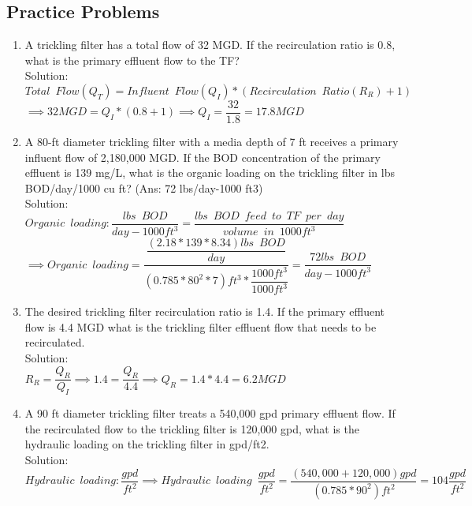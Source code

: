 \documentclass{article}
\begin{document}
\subsection{Practice Problems} 

\begin{enumerate}

\item A trickling filter has a total flow of 32 MGD.  If the recirculation ratio is 0.8, what is the primary effluent flow to the TF?\\
Solution:\\
$Total \enspace Flow (Q_T) = Influent \enspace Flow (Q_I)*(Recirculation \enspace Ratio(R_R) +1)$\\
$\implies 32 MGD=Q_I*(0.8+1)\implies Q_I=\dfrac{32}{1.8}=\boxed{17.8 MGD}$

\item A 80-ft diameter trickling filter with a media depth of 7 ft receives a primary influent flow of 2,180,000 MGD. If the BOD concentration of the primary effluent is 139 mg/L, what is the organic loading on the trickling filter in lbs BOD/day/1000 cu ft? (Ans: 72 lbs/day-1000 ft3)\\
Solution:\\
$Organic \enspace loading:\dfrac{lbs \enspace BOD}{day-1000ft^3}=\dfrac{lbs \enspace BOD \enspace feed \enspace to \enspace TF \enspace per \enspace day}{volume \enspace in \enspace 1000ft^3}$\\
\vspace{0.3cm}
$\implies Organic \enspace loading=\dfrac{\dfrac{(2.18*139*8.34)lbs \enspace BOD}{day}}{(0.785*80^2*7)ft^3*\dfrac{1000ft^3}{1000ft^3}}=\boxed{\dfrac{72 lbs \enspace BOD}{day-1000 ft^3}}$

\item The desired trickling filter recirculation ratio is 1.4.  If the primary effluent flow is 4.4 MGD what is the trickling filter effluent flow that needs to be recirculated.\\
Solution:\\
$R_R=\dfrac{Q_R}{Q_I}\implies 1.4=\dfrac{Q_R}{4.4}\implies Q_R =1.4*4.4=\boxed{6.2 MGD}$\\

\item A 90 ft diameter trickling filter treats a 540,000 gpd primary effluent flow. If the recirculated flow to the trickling filter is 120,000 gpd, what is the hydraulic loading on the trickling filter in gpd/ft2.\\
Solution:\\
$Hydraulic \enspace loading:\dfrac{gpd}{ft^2} \implies Hydraulic \enspace loading \enspace \dfrac{gpd}{ft^2}=\dfrac{(540,000+120,000)gpd}{(0.785*90^2)ft^2} =\boxed{104\dfrac{gpd}{ft^2}}$


\end{enumerate}
\end{document}
